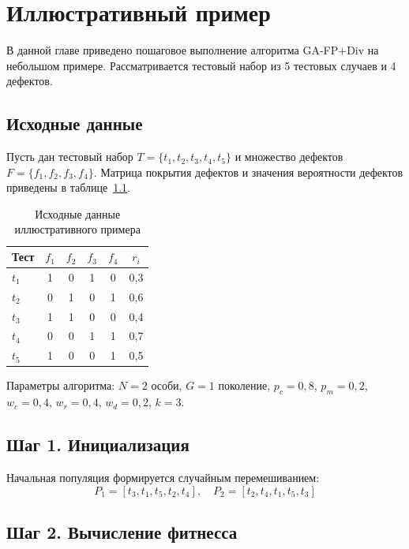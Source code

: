 \chapter{Иллюстративный пример} \label{ch4}

В данной главе приведено пошаговое выполнение алгоритма GA-FP+Div на небольшом примере. 
Рассматривается тестовый набор из 5 тестовых случаев и 4 дефектов.

\section{Исходные данные} \label{ch4:sec1}

Пусть дан тестовый набор $T = \{t_1, t_2, t_3, t_4, t_5\}$ и множество дефектов 
$F = \{f_1, f_2, f_3, f_4\}$. Матрица покрытия дефектов и значения вероятности дефектов приведены в 
таблице~\ref{tab:example}.

\begin{table}[h]
\caption{Исходные данные иллюстративного примера}
\label{tab:example}
\begin{tabularx}{\textwidth}{|X|c|c|c|c|c|}
\hline
Тест & $f_1$ & $f_2$ & $f_3$ & $f_4$ & $r_i$ \\
\hline
$t_1$ & 1 & 0 & 1 & 0 & 0{,}3 \\
$t_2$ & 0 & 1 & 0 & 1 & 0{,}6 \\
$t_3$ & 1 & 1 & 0 & 0 & 0{,}4 \\
$t_4$ & 0 & 0 & 1 & 1 & 0{,}7 \\
$t_5$ & 1 & 0 & 0 & 1 & 0{,}5 \\
\hline
\end{tabularx}
\end{table}

Параметры алгоритма: $N = 2$ особи, $G = 1$ поколение, 
$p_c = 0{,}8$, $p_m = 0{,}2$, $w_c = 0{,}4$, $w_r = 0{,}4$, 
$w_d = 0{,}2$, $k = 3$.

\section{Шаг 1. Инициализация} \label{ch4:sec2}

Начальная популяция формируется случайным перемешиванием:
$$P_1 = [t_3, t_1, t_5, t_2, t_4], \quad P_2 = [t_2, t_4, t_1, t_5, t_3]$$

\section{Шаг 2. Вычисление фитнесса} \label{ch4:sec3}

